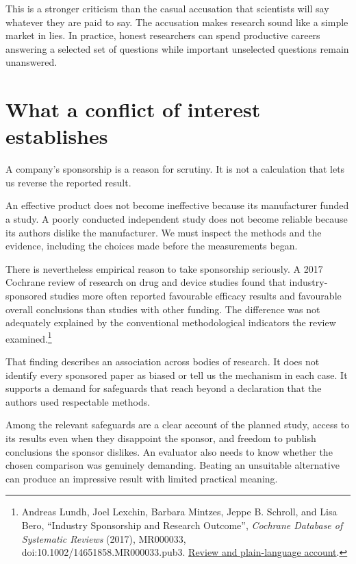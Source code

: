 \documentclass[12pt,a4paper]{book}
\begin{document}
This is a stronger criticism than the casual accusation that scientists will say whatever they are paid to say. The accusation makes research sound like a simple market in lies. In practice, honest researchers can spend productive careers answering a selected set of questions while important unselected questions remain unanswered.

\section*{What a conflict of interest establishes}

A company's sponsorship is a reason for scrutiny. It is not a calculation that lets us reverse the reported result.

An effective product does not become ineffective because its manufacturer funded a study. A poorly conducted independent study does not become reliable because its authors dislike the manufacturer. We must inspect the methods and the evidence, including the choices made before the measurements began.

There is nevertheless empirical reason to take sponsorship seriously. A 2017 Cochrane review of research on drug and device studies found that industry-sponsored studies more often reported favourable efficacy results and favourable overall conclusions than studies with other funding. The difference was not adequately explained by the conventional methodological indicators the review examined.\footnote{Andreas Lundh, Joel Lexchin, Barbara Mintzes, Jeppe B. Schroll, and Lisa Bero, ``Industry Sponsorship and Research Outcome'', \emph{Cochrane Database of Systematic Reviews} (2017), MR000033, doi:10.1002/14651858.MR000033.pub3. \href{https://www.cochrane.org/evidence/MR000033_industry-sponsorship-and-research-outcome}{Review and plain-language account}.}

That finding describes an association across bodies of research. It does not identify every sponsored paper as biased or tell us the mechanism in each case. It supports a demand for safeguards that reach beyond a declaration that the authors used respectable methods.

Among the relevant safeguards are a clear account of the planned study, access to its results even when they disappoint the sponsor, and freedom to publish conclusions the sponsor dislikes. An evaluator also needs to know whether the chosen comparison was genuinely demanding. Beating an unsuitable alternative can produce an impressive result with limited practical meaning.
\end{document}
